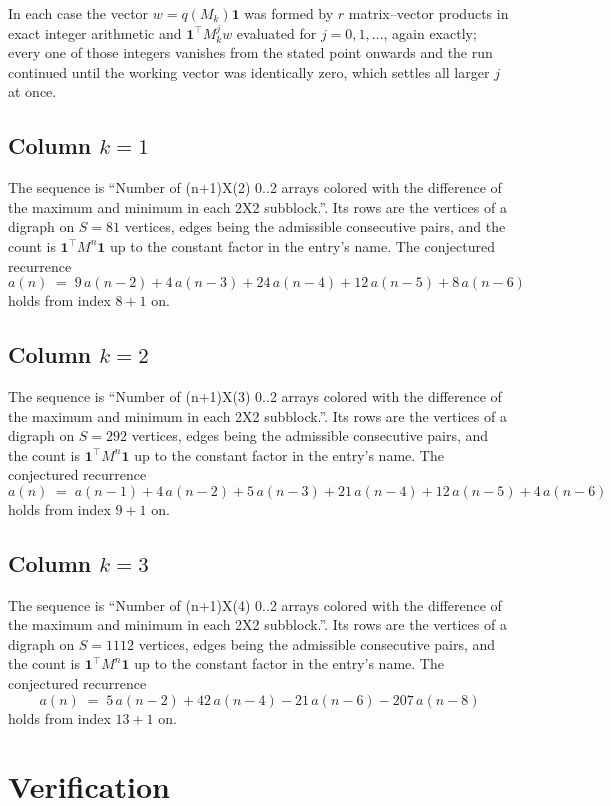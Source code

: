 \documentclass[11pt,a4paper]{article}
\theoremstyle{plain}
\theoremstyle{definition}
\begin{document}
In each case the vector $w=q(M_k)\mathbf{1}$ was formed by $r$ matrix--vector products in
exact integer arithmetic and $\mathbf{1}^{\!\top}M_k^{j}w$ evaluated for $j=0,1,\dots$,
again exactly; every one of those integers vanishes from the stated point onwards and the run
continued until the working vector was identically zero, which settles all larger $j$ at once.

\subsection*{Column $k$$=1$}
The sequence is ``Number of (n+1)X(2) 0..2 arrays colored with the difference of the maximum and minimum in each 2X2 subblock.''. Its rows are the vertices of a digraph on
$S=81$ vertices, edges being the admissible consecutive pairs, and the count is
$\mathbf{1}^{\!\top}M^{n}\mathbf{1}$ up to the constant factor in the entry's name.
The conjectured recurrence
\[
a(n)\;=\;9\,a(n-2) + 4\,a(n-3) + 24\,a(n-4) + 12\,a(n-5) + 8\,a(n-6)
\]
holds from index $8+1$ on.

\subsection*{Column $k$$=2$}
The sequence is ``Number of (n+1)X(3) 0..2 arrays colored with the difference of the maximum and minimum in each 2X2 subblock.''. Its rows are the vertices of a digraph on
$S=292$ vertices, edges being the admissible consecutive pairs, and the count is
$\mathbf{1}^{\!\top}M^{n}\mathbf{1}$ up to the constant factor in the entry's name.
The conjectured recurrence
\[
a(n)\;=\;a(n-1) + 4\,a(n-2) + 5\,a(n-3) + 21\,a(n-4) + 12\,a(n-5) + 4\,a(n-6)
\]
holds from index $9+1$ on.

\subsection*{Column $k$$=3$}
The sequence is ``Number of (n+1)X(4) 0..2 arrays colored with the difference of the maximum and minimum in each 2X2 subblock.''. Its rows are the vertices of a digraph on
$S=1112$ vertices, edges being the admissible consecutive pairs, and the count is
$\mathbf{1}^{\!\top}M^{n}\mathbf{1}$ up to the constant factor in the entry's name.
The conjectured recurrence
\[
a(n)\;=\;5\,a(n-2) + 42\,a(n-4) - 21\,a(n-6) - 207\,a(n-8)
\]
holds from index $13+1$ on.

\section{Verification}
\end{document}
